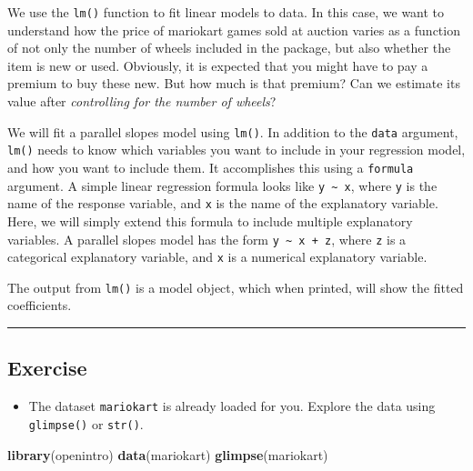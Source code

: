 \documentclass[
]{book}
\newenvironment{Shaded}{\begin{snugshade}}{\end{snugshade}}
\newcommand{\KeywordTok}[1]{\textcolor[rgb]{0.13,0.29,0.53}{\textbf{#1}}}
\newcommand{\NormalTok}[1]{#1}
\providecommand{\tightlist}{%
  \setlength{\itemsep}{0pt}\setlength{\parskip}{0pt}}
\begin{document}
We use the \texttt{lm()} function to fit linear models to data. In this case, we want to understand how the price of mariokart games sold at auction varies as a function of not only the number of wheels included in the package, but also whether the item is new or used. Obviously, it is expected that you might have to pay a premium to buy these new. But how much is that premium? Can we estimate its value after \emph{controlling for the number of wheels}?

We will fit a parallel slopes model using \texttt{lm()}. In addition to the \texttt{data} argument, \texttt{lm()} needs to know which variables you want to include in your regression model, and how you want to include them. It accomplishes this using a \texttt{formula} argument. A simple linear regression formula looks like \texttt{y\ \textasciitilde{}\ x}, where \texttt{y} is the name of the response variable, and \texttt{x} is the name of the explanatory variable. Here, we will simply extend this formula to include multiple explanatory variables. A parallel slopes model has the form \texttt{y\ \textasciitilde{}\ x\ +\ z}, where \texttt{z} is a categorical explanatory variable, and \texttt{x} is a numerical explanatory variable.

The output from \texttt{lm()} is a model object, which when printed, will show the fitted coefficients.

\begin{center}\rule{0.5\linewidth}{0.5pt}\end{center}

\hypertarget{exercise}{%
\subsection*{Exercise}\label{exercise}}

\begin{itemize}
\tightlist
\item
  The dataset \texttt{mariokart} is already loaded for you. Explore the data using \texttt{glimpse()} or \texttt{str()}.
\end{itemize}

\begin{Shaded}
\begin{Highlighting}[]
\KeywordTok{library}\NormalTok{(openintro)}
\KeywordTok{data}\NormalTok{(mariokart)}
\KeywordTok{glimpse}\NormalTok{(mariokart)}
\end{Highlighting}
\end{Shaded}
\end{document}
